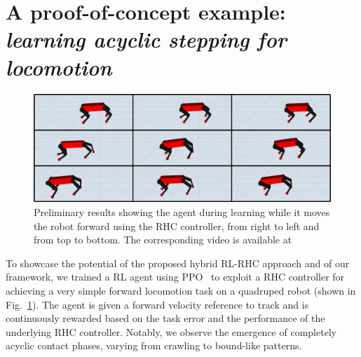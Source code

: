 \section{A proof-of-concept example: \textnormal{\textit{learning acyclic stepping for locomotion}}}
\begin{figure}[t]
	\centering
	\includegraphics[width=0.9\columnwidth]{imgs/proof_of_concept.pdf}
	\caption{Preliminary results showing the agent during learning while it moves the robot forward using the RHC controller, from right to left and from top to bottom. The corresponding video is available at~\cite{web::poc_link}}
	\label{fig:proof}
\end{figure}
To showcase the potential of the proposed hybrid RL-RHC approach and of our framework, we trained a RL agent using PPO~\cite{rl:schulman2017proximal} to exploit a RHC controller for achieving a very simple forward locomotion task on a quadruped robot (shown in Fig.~\ref{fig:proof}). The agent is given a forward velocity reference to track and is continuously rewarded based on the task error and the performance of the underlying RHC controller. Notably, we observe the emergence of completely acyclic contact phases, varying from crawling to bound-like patterns.
 